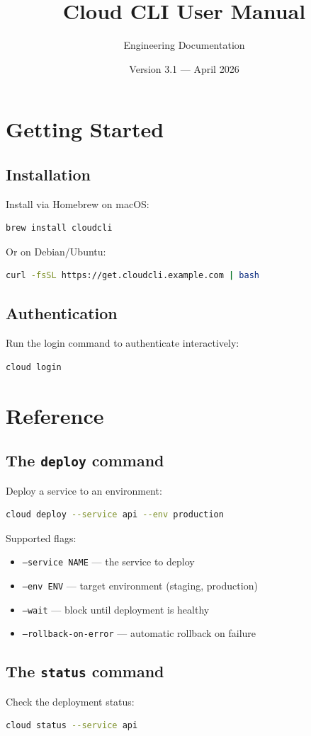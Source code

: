 \documentclass[11pt]{book}
\title{Cloud CLI User Manual}
\author{Engineering Documentation}
\date{Version 3.1 --- April 2026}
\begin{document}
\maketitle
\tableofcontents

\chapter{Getting Started}

\section{Installation}
Install via Homebrew on macOS:
\begin{lstlisting}[language=bash]
brew install cloudcli
\end{lstlisting}

Or on Debian/Ubuntu:
\begin{lstlisting}[language=bash]
curl -fsSL https://get.cloudcli.example.com | bash
\end{lstlisting}

\section{Authentication}
Run the login command to authenticate interactively:
\begin{lstlisting}[language=bash]
cloud login
\end{lstlisting}

\chapter{Reference}

\section{The \texttt{deploy} command}
Deploy a service to an environment:
\begin{lstlisting}[language=bash]
cloud deploy --service api --env production
\end{lstlisting}

Supported flags:
\begin{itemize}
  \item \texttt{--service NAME} --- the service to deploy
  \item \texttt{--env ENV} --- target environment (staging, production)
  \item \texttt{--wait} --- block until deployment is healthy
  \item \texttt{--rollback-on-error} --- automatic rollback on failure
\end{itemize}

\section{The \texttt{status} command}
Check the deployment status:
\begin{lstlisting}[language=bash]
cloud status --service api
\end{lstlisting}
\end{document}
